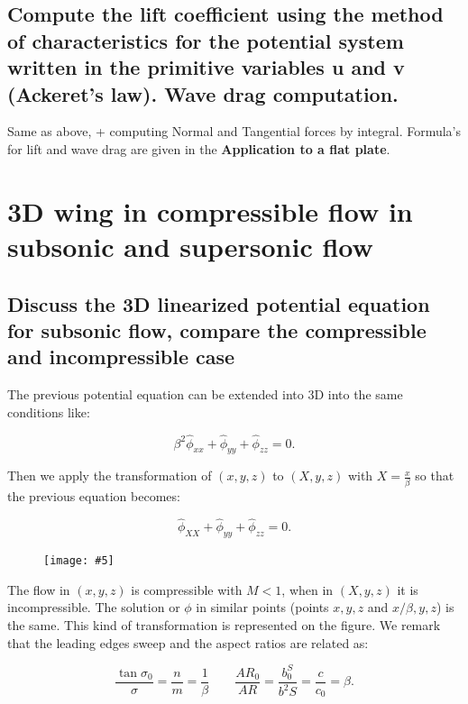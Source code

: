 \documentclass[british,french,11pt, a4paper, openany]{article}
\newcommand{\wrapfig}[6]{%
	\begin{figure}%
		\vspace{-5mm}%
		\texttt{[image: \#5]}%
		\captionof{figure}{}%
		\label{#6}%
	\end{figure}%
}
\begin{document}
\subsection{Compute the lift coefficient using the method of characteristics for the	potential system written in the primitive variables u and v (Ackeret’s law). Wave drag computation.}
Same as above, + computing Normal and Tangential forces by integral. Formula's for lift and wave drag are given in the \textbf{Application to a flat plate}.




\section{3D wing in compressible flow in subsonic and supersonic flow}
\subsection{Discuss the 3D linearized potential equation for subsonic flow, compare the	compressible and incompressible case}
The previous potential equation can be extended into 3D into the same conditions like: 

\begin{equation}
\beta ^2 \hat{\phi} _{xx} + \hat{\phi} _{yy} + \hat{\phi} _{zz} = 0.
\end{equation}

Then we apply the transformation of $(x, y, z)$ to $(X, y, z)$ with $X = \frac{x}{\beta}$ so that the previous equation becomes: 

\begin{equation}
\hat{\phi} _{XX} + \hat{\phi} _{yy} + \hat{\phi} _{zz} = 0.
\end{equation}

\wrapfig{7}{l}{6}{0.07}{ch7/1}{ch7/1}
The flow in $(x,y,z)$ is compressible with $M<1$, when in $(X,y,z)$ it is incompressible. The solution or $\phi$ in similar points (points $x,y,z$ and $x/\beta,y,z$) is the same. This kind of transformation is represented on the figure. We remark that the leading edges sweep and the aspect ratios are related as: 

\begin{equation}
\frac{\tan \sigma _0}{\sigma} = \frac{n}{m} = \frac{1}{\beta} \qquad \frac{AR_0}{AR} = \frac{b^S_0}{b^2S} = \frac{c}{c_0} = \beta. 
\end{equation}
\end{document}
